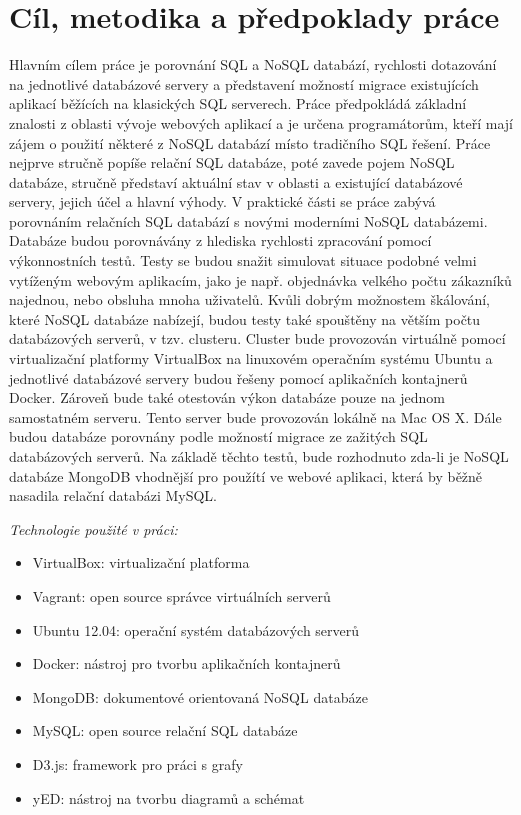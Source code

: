 \section{Cíl, metodika a předpoklady práce}
Hlavním cílem práce je porovnání SQL a NoSQL databází, rychlosti dotazování na jednotlivé databázové servery a představení možností migrace existujících aplikací běžících na klasických SQL serverech. Práce předpokládá základní znalosti z oblasti vývoje webových aplikací a je určena programátorům, kteří mají zájem o použití některé z NoSQL databází místo tradičního SQL řešení. Práce nejprve stručně popíše relační SQL databáze, poté zavede pojem NoSQL databáze, stručně představí aktuální stav v oblasti a existující databázové servery, jejich účel a hlavní výhody. V praktické části se práce zabývá porovnáním relačních SQL databází s novými moderními NoSQL databázemi. Databáze budou porovnávány z hlediska rychlosti zpracování pomocí výkonnostních testů. Testy se budou snažit simulovat situace podobné velmi vytíženým webovým aplikacím, jako je např. objednávka velkého počtu zákazníků najednou, nebo obsluha mnoha uživatelů. Kvůli dobrým možnostem škálování, které NoSQL databáze nabízejí, budou testy také spouštěny na větším počtu databázových serverů, v tzv. clusteru. Cluster bude provozován virtuálně pomocí virtualizační platformy VirtualBox na linuxovém operačním systému Ubuntu a jednotlivé databázové servery budou řešeny pomocí aplikačních kontajnerů Docker. Zároveň bude také otestován výkon databáze pouze na jednom samostatném serveru. Tento server bude provozován lokálně na Mac OS X. Dále budou databáze porovnány podle možností migrace ze zažitých SQL databázových serverů. Na základě těchto testů, bude rozhodnuto zda-li je NoSQL databáze MongoDB vhodnější pro použítí ve webové aplikaci, která by běžně nasadila relační databázi MySQL.

\vspace{0.5cm}
\noindent \emph{Technologie použité v práci:}
\begin{itemize}
\item VirtualBox: virtualizační platforma
\item Vagrant: open source správce virtuálních serverů
\item Ubuntu 12.04: operační systém databázových serverů
\item Docker: nástroj pro tvorbu aplikačních kontajnerů
\item MongoDB: dokumentové orientovaná NoSQL databáze
\item MySQL: open source relační SQL databáze
\item D3.js: framework pro práci s grafy
\item yED: nástroj na tvorbu diagramů a schémat
\end{itemize}

